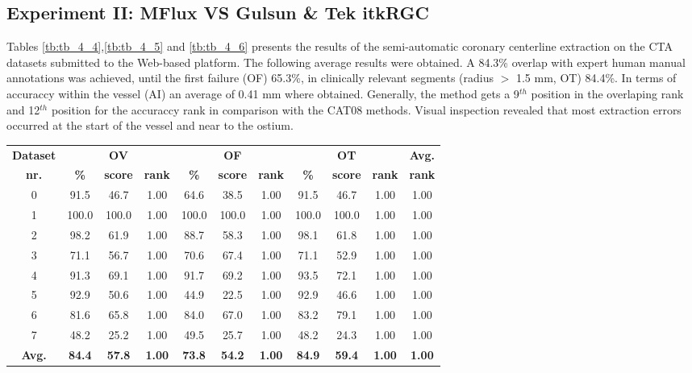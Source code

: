 \subsection{Experiment II: MFlux VS Gulsun \& Tek itkRGC}



Tables \ref{tb:tb_4_4},\ref{tb:tb_4_5} and \ref{tb:tb_4_6}  presents the results of the semi-automatic coronary centerline extraction on the CTA datasets submitted to the Web-based platform. The following average results were obtained. A 84.3\% overlap with expert human manual annotations was achieved, until the first failure (OF) 65.3\%, in clinically relevant segments (radius $>$ 1.5 mm, OT) 84.4\%. In terms of accuraccy within the vessel (AI) an average of 0.41 mm where obtained. Generally, the method gets a 9$^{th}$ position in the overlaping rank and 12$^{th}$ position for the accuraccy rank in comparison with the CAT08 methods. Visual inspection revealed that most extraction errors occurred at the start of the vessel and near to the ostium.

\begin{table*}
\scriptsize
\caption{Average overlap per dataset}
\centering
\begin{tabular}{|c|ccc|ccc|ccc|c|}
\hline
\multicolumn{1}{|c|}{\textbf{Dataset}} &\multicolumn{3}{c|}{\textbf{OV}} &\multicolumn{3}{c|}{\textbf{OF}} &\multicolumn{3}{c|}{\textbf{OT}} &\multicolumn{1}{c|}{\textbf{Avg.}} \\
\multicolumn{1}{|c|}{\textbf{nr.}} &\multicolumn{1}{c|}{\textbf{\%}} &\multicolumn{1}{c|}{\textbf{score}} &\multicolumn{1}{c|}{\textbf{rank}} &\multicolumn{1}{c|}{\textbf{\%}} &\multicolumn{1}{c|}{\textbf{score}} &\multicolumn{1}{c|}{\textbf{rank}} &\multicolumn{1}{c|}{\textbf{\%}} &\multicolumn{1}{c|}{\textbf{score}} &\multicolumn{1}{c|}{\textbf{rank}} &\multicolumn{1}{c|}{\textbf{rank}}\\
\hline
0&91.5&46.7& 1.00&64.6&38.5& 1.00&91.5&46.7& 1.00& 1.00\\
1&100.0&100.0& 1.00&100.0&100.0& 1.00&100.0&100.0& 1.00& 1.00\\
2&98.2&61.9& 1.00&88.7&58.3& 1.00&98.1&61.8& 1.00& 1.00\\
3&71.1&56.7& 1.00&70.6&67.4& 1.00&71.1&52.9& 1.00& 1.00\\
4&91.3&69.1& 1.00&91.7&69.2& 1.00&93.5&72.1& 1.00& 1.00\\
5&92.9&50.6& 1.00&44.9&22.5& 1.00&92.9&46.6& 1.00& 1.00\\
6&81.6&65.8& 1.00&84.0&67.0& 1.00&83.2&79.1& 1.00& 1.00\\
7&48.2&25.2& 1.00&49.5&25.7& 1.00&48.2&24.3& 1.00& 1.00\\
\hline
\textbf{Avg.}&\textbf{84.4}&\textbf{57.8}&\textbf{ 1.00}&\textbf{73.8}&\textbf{54.2}&\textbf{ 1.00}&\textbf{84.9}&\textbf{59.4}&\textbf{ 1.00}&\textbf{ 1.00}\\
\hline
\end{tabular}
\vspace{-0.3cm}
\label{tb:tb_4_4}
\normalsize
\end{table*}

